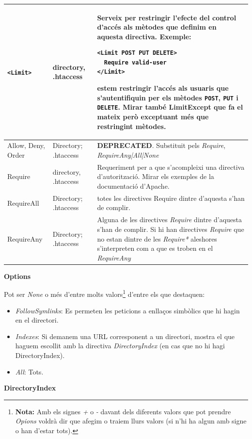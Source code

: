 \documentclass[a4paper, 11pt]{article}
\begin{document}
\begin{longtable}{|p{4cm}|p{3cm}|p{5cm}|}
\verb+<Limit>+ & directory, .htaccess & Serveix per restringir l'efecte 
del control d'accés als mètodes que definim en aquesta directiva. 
Exemple:
\begin{verbatim}
<Limit POST PUT DELETE>
  Require valid-user
</Limit>
\end{verbatim}
estem restringir l'accés als usuaris que s'autentifiquin 
per els mètodes \verb+POST+, \verb+PUT+ i \verb+DELETE+. Mirar també LimitExcept que fa el mateix però exceptuant més que restringint mètodes. \\
\hline
Allow, Deny, Order & Directory; .htaccess& \textbf{DEPRECATED}. Substituit pels \textit{Require}, \textit{RequireAny|All|None} \\
\hline
Require & directory, .htaccess & Requeriment per a que s'acompleixi una directiva d'autorització. Mirar els exemples de la documentació d'Apache. \\
\hline
RequireAll & Directory; .htaccess & totes les directives Require dintre d'aquesta s'han de complir. \\
\hline
RequireAny & Directory; .htaccess & Alguna de les directives \textit{Require} dintre d'aquesta s'han de complir. Si hi han directives \textit{Require} que no estan dintre de les \textit{Require*} aleshores s'interpreten com a que es troben en el \textit{RequireAny}\\
\hline
\end{longtable}

\textbf{Options}

Pot ser \textit{None} o m\'es d'entre molts valors\footnote{\textbf{Nota:} Amb els signes \textit{+} o \textit{-} davant dels diferents valors que pot prendre \textit{Opions} voldrà dir que afegim o traiem llurs valors (si n'hi ha algun amb signe o han d'estar tots).}
 d'entre els que destaquen:

\begin{itemize}
	\item \textit{FollowSymlinks}: Es permeten les peticions a enllaços simbòlics que hi hagin en el directori.
	\item \textit{Indexes}: Si demanem una URL corresponent a un directori, mostra el que haguem escollit amb la directiva \textit{DirectoryIndex} (en cas que no hi hagi DirectoryIndex).
	\item \textit{All}: Tots.
\end{itemize}
\textbf{DirectoryIndex}
\end{document}
